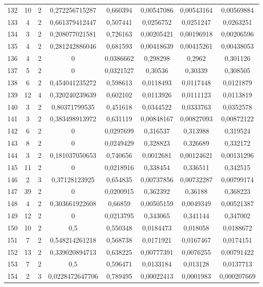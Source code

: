 \begin{longtable}{|c|c|c|c|c|c|c|c|}
132 & 10 & 2 & 0,272256715287 & 0,660394 & 0,00547086 & 0,00543164 & 0,00569884  \\
133 & 4 & 2 & 0,661379412447 & 0,507441 & 0,0256752 & 0,0251247 & 0,0263251  \\
134 & 3 & 2 & 0,208077021581 & 0,726163 & 0,00205421 & 0,00196918 & 0,00206596  \\
135 & 4 & 2 & 0,281242886046 & 0,681593 & 0,00418639 & 0,00415261 & 0,00438053  \\
136 & 4 & 2 & 0 & 0,0386662 & 0,298298 & 0,2962 & 0,301126  \\
137 & 5 & 2 & 0 & 0,0321527 & 0,30536 & 0,30339 & 0,308505  \\
138 & 6 & 2 & 0,454041235272 & 0,598613 & 0,0118493 & 0,0117448 & 0,0121879  \\
139 & 12 & 4 & 0,320240239639 & 0,602102 & 0,0113926 & 0,0111123 & 0,0113819  \\
140 & 3 & 2 & 0,80371799535 & 0,451618 & 0,0344522 & 0,0333763 & 0,0352578  \\
141 & 3 & 2 & 0,383498913972 & 0,631119 & 0,00848167 & 0,00827093 & 0,00872122  \\
142 & 6 & 2 & 0 & 0,0297699 & 0,316537 & 0,313988 & 0,319524  \\
143 & 8 & 2 & 0 & 0,0249429 & 0,328823 & 0,326689 & 0,332172  \\
144 & 3 & 2 & 0,181037050653 & 0,740656 & 0,0012681 & 0,00124621 & 0,00131296  \\
145 & 11 & 2 & 0 & 0,0218916 & 0,338454 & 0,336511 & 0,342515  \\
146 & 2 & 3 & 0,37128123925 & 0,654835 & 0,00737856 & 0,00732287 & 0,00799174  \\
147 & 39 & 2 & 0 & 0,0200915 & 0,362392 & 0,36188 & 0,368223  \\
148 & 4 & 2 & 0,303661922608 & 0,66859 & 0,00505159 & 0,0049349 & 0,00521387  \\
149 & 12 & 2 & 0 & 0,0213795 & 0,343065 & 0,341144 & 0,347002  \\
150 & 10 & 2 & 0,5 & 0,550348 & 0,0184473 & 0,018058 & 0,0188672  \\
151 & 7 & 2 & 0,548214261218 & 0,568738 & 0,0171921 & 0,0167467 & 0,0174151  \\
152 & 13 & 2 & 0,339020894713 & 0,638225 & 0,00777391 & 0,0076255 & 0,00791422  \\
153 & 7 & 2 & 0,5 & 0,596471 & 0,0133184 & 0,013128 & 0,0137713  \\
154 & 2 & 3 & 0,0228472647706 & 0,789495 & 0,00022413 & 0,0001983 & 0,000207669  \\

\end{longtable}
